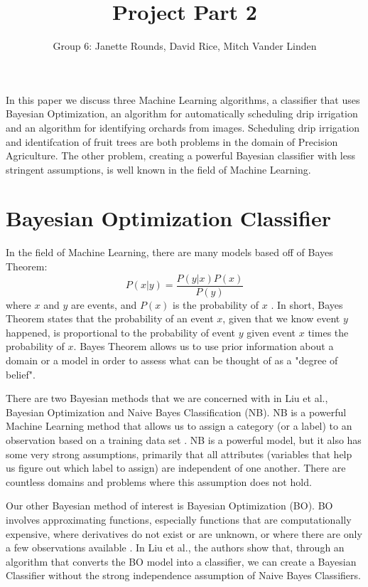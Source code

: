 \documentclass[]{article}
\title{Project Part 2}
\author{Group 6: Janette Rounds, David Rice, Mitch Vander Linden}
\begin{document}
\maketitle

In this paper we discuss three Machine Learning algorithms, a classifier that uses Bayesian Optimization, an algorithm for automatically scheduling drip irrigation and an algorithm for identifying orchards from images. Scheduling drip irrigation and identifcation of fruit trees are both problems in the domain of Precision Agriculture. The other problem, creating a powerful Bayesian classifier with less stringent assumptions, is well known in the field of Machine Learning. 

\section{Bayesian Optimization Classifier}
In the field of Machine Learning, there are many models based off of Bayes Theorem: 
$$P(x|y) = \frac{P(y|x)P(x)}{P(y)}$$ where $x$ and $y$ are events, and $P(x)$ is the probability of $x$ \cite{koller2009probabilistic}.  In short, Bayes Theorem states that the probability of an event $x$, given that we know event $y$ happened, is proportional to the probability of event $y$ given event $x$ times the probability of $x$. Bayes Theorem allows us to use prior information about a domain or a model in order to assess what can be thought of as a "degree of belief". 

There are two Bayesian methods that we are concerned with in Liu et al.\cite[Liu 2013]{liu2013bayesian}, Bayesian Optimization and Naive Bayes Classification (NB).  NB is a powerful Machine Learning method that allows us to assign a category (or a label) to an observation based on a training data set \cite{koller2009probabilistic}. NB is a powerful model, but it also has some very strong assumptions, primarily that all attributes (variables that help us figure out which label to assign) are independent of one another. There are countless domains and problems where this assumption does not hold. 

Our other Bayesian method of interest is Bayesian Optimization (BO). BO involves approximating functions, especially functions that are computationally expensive, where derivatives do not exist or are unknown, or where there are only a few observations available \cite{brochu2010tutorial}. In Liu et al.\cite[Liu 2013]{liu2013bayesian}, the authors show that, through an algorithm that converts the BO model into a classifier, we can create a Bayesian Classifier without the strong independence assumption of Naive Bayes Classifiers. 
\end{document}
